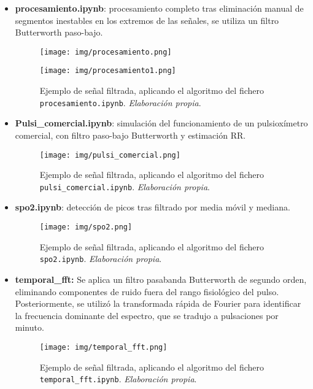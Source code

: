 \begin{itemize}
\begin{figure}[H]
        \label{fig:FFT}
    \end{figure}
    \item \textbf{procesamiento.ipynb}: procesamiento completo tras eliminación manual de segmentos inestables en los extremos de las señales, se utiliza un filtro Butterworth paso-bajo.
    \begin{figure}[H]
        \centering
        \texttt{[image: img/procesamiento.png]}
        \label{fig:FFT}
    \end{figure}
    \begin{figure}[H]
        \centering
        \texttt{[image: img/procesamiento1.png]}
        \caption{Ejemplo de señal filtrada, aplicando el algoritmo del fichero \texttt{procesamiento.ipynb}. \textit{Elaboración propia}.}
        \label{fig:FFT}
    \end{figure}
    \item \textbf{Pulsi\_comercial.ipynb}: simulación del funcionamiento de un pulsioxímetro comercial, con filtro paso-bajo Butterworth y estimación RR.
    \begin{figure}[H]
        \centering
        \texttt{[image: img/pulsi\_comercial.png]}
        \caption{Ejemplo de señal filtrada, aplicando el algoritmo del fichero \texttt{pulsi\_comercial.ipynb}. \textit{Elaboración propia}.}
        \label{fig:pulsi_comercial}
    \end{figure}
    \item \textbf{spo2.ipynb}: detección de picos tras filtrado por media móvil y mediana.
    \begin{figure}[H]
        \centering
        \texttt{[image: img/spo2.png]}
        \caption{Ejemplo de señal filtrada, aplicando el algoritmo del fichero \texttt{spo2.ipynb}. \textit{Elaboración propia}.}
        \label{fig:spo2}
    \end{figure}
    \item \textbf{temporal\_fft:} Se aplica un filtro pasabanda Butterworth de segundo orden, eliminando componentes de ruido fuera del rango fisiológico del pulso. Posteriormente, se utilizó la transformada rápida de Fourier para identificar la frecuencia dominante del espectro, que se tradujo a pulsaciones por minuto.
    \begin{figure}[H]
        \centering
        \texttt{[image: img/temporal\_fft.png]}
        \caption{Ejemplo de señal filtrada, aplicando el algoritmo del fichero \texttt{temporal\_fft.ipynb}. \textit{Elaboración propia}.}
        \label{fig:temporal_fft}
    \end{figure}
\end{itemize}

